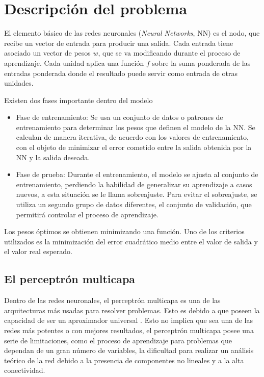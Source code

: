\section{Descripción del problema}
El elemento básico de las redes neuronales ({\em Neural Networks}, NN) es el nodo, que recibe un vector de entrada para producir una salida. Cada entrada tiene asociado un vector de pesos $w$, que se va modificando durante el proceso de aprendizaje. Cada unidad aplica una función $f$ sobre la suma ponderada de las entradas ponderada
donde el resultado puede servir como entrada de otras unidades.

Existen dos fases importante dentro del modelo
\begin{itemize}
	\item Fase de entrenamiento: Se usa un conjunto de datos o patrones de entrenamiento para determinar los pesos que definen el modelo de la NN. Se calculan de manera iterativa, de acuerdo con los valores de entrenamiento, con el objeto de minimizar el error cometido entre la salida obtenida por la NN y la salida deseada.

	\item Fase de prueba: Durante el entrenamiento, el modelo se ajusta al conjunto de entrenamiento, perdiendo la habilidad de generalizar su aprendizaje a casos nuevos, a esta situación se le llama sobreajuste.
	Para evitar el sobreajuste, se utiliza un segundo grupo de datos diferentes, el conjunto de validación, que permitirá controlar el proceso de aprendizaje.
\end{itemize}
Los pesos óptimos se obtienen minimizando una función. Uno de los criterios utilizados es la minimización del error cuadrático medio entre el valor de salida y el valor real esperado.


\subsection{El perceptrón multicapa}
Dentro de las redes neuronales, el perceptrón multicapa es una de las arquitecturas más usadas para resolver problemas. Esto es debido a que poseen la capacidad de ser un aproximador universal \cite{Minsky1969b}. Esto no implica que sea una de las redes más potentes o con mejores resultados, el perceptrón multicapa posee una serie de limitaciones, como el proceso de aprendizaje para problemas que dependan de un gran número de variables, la dificultad para realizar un análisis teórico de la red debido a la presencia de componentes no lineales y a la alta conectividad.

